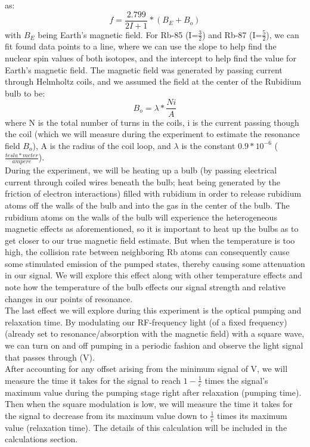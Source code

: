 \documentclass{article}
\begin{document}
    as:
    \begin{equation}
        f = \frac{2.799}{2I+1}*(B_E + B_o)
    \end{equation}
    with $B_E$ being Earth's magnetic field. For Rb-85 (I=$\frac{3}{2}$) and Rb-87 (I=$\frac{5}{2}$), we can fit found data points to a line, where we can use the slope to help find the nuclear spin values of both isotopes, and the intercept to help find the value for Earth's magnetic field. The magnetic field was generated by passing current through Helmholtz coils, and we assumed the field at the center of the Rubidium bulb to be:
    \begin{equation}
        B_o = \lambda*\frac{Ni}{A}
    \end{equation}
    where N is the total number of turns in the coils, i is the current passing though the coil (which we will measure during the experiment to estimate the resonance field $B_o$), A is the radius of the coil loop, and $\lambda$ is the constant $0.9*10^{-6}$ ($\frac{tesla*meter}{ampere}$).\cite{opt} 
    \\\indent During the experiment, we will be heating up a bulb (by passing electrical current through coiled wires beneath the bulb; heat being generated by the friction of electron interactions) filled with rubidium in order to release rubidium atoms off the walls of the bulb and into the gas in the center of the bulb. The rubidium atoms on the walls of the bulb will experience the heterogeneous magnetic effects as aforementioned, so it is important to heat up the bulbs as to get closer to our true magnetic field estimate. But when the temperature is too high, the collision rate between neighboring Rb atoms can consequently cause some stimulated emission of the pumped states, thereby causing some attenuation in our signal. We will explore this effect along with other temperature effects and note how the temperature of the bulb effects our signal strength and relative changes in our points of resonance.
    \\\indent The last effect we will explore during this experiment is the optical pumping and relaxation time. By modulating our RF-frequency light (of a fixed frequency) (already set to resonance/absorption with the magnetic field) with a square wave, we can turn on and off pumping in a periodic fashion and observe the light signal that passes through (V).
    \\\indent After accounting for any offset arising from the minimum signal of V, we will measure the time it takes for the signal to reach $1-\frac{1}{e}$ times the signal's maximum value during the pumping stage right after relaxation (pumping time). Then when the square modulation is low, we will measure the time it takes for the signal to decrease from its maximum value down to $\frac{1}{e}$ times its maximum value (relaxation time). The details of this calculation will be included in the calculations section.
\end{document}

